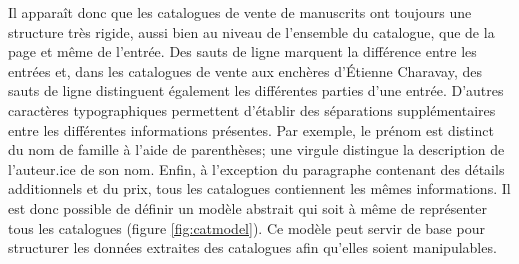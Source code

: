 Il apparaît donc que les catalogues de vente de manuscrits ont toujours une structure très rigide, aussi bien au niveau de l'ensemble du catalogue, que de la page et même de l'entrée. Des sauts de ligne marquent la différence entre les entrées et, dans les catalogues de vente aux enchères d'Étienne Charavay, des sauts de ligne distinguent également les différentes parties d'une entrée. D'autres caractères typographiques permettent d'établir des séparations supplémentaires entre les différentes informations présentes. Par exemple, le prénom est distinct du nom de famille à l'aide de parenthèses; une virgule distingue la description de l'auteur.ice de son nom. Enfin, à l'exception du paragraphe contenant des détails additionnels et du prix, tous les catalogues contiennent les mêmes informations. Il est donc possible de définir un modèle abstrait qui soit à même de représenter tous les catalogues (figure \ref{fig:catmodel}). Ce modèle peut servir de base pour structurer les données extraites des catalogues afin qu'elles soient manipulables.

